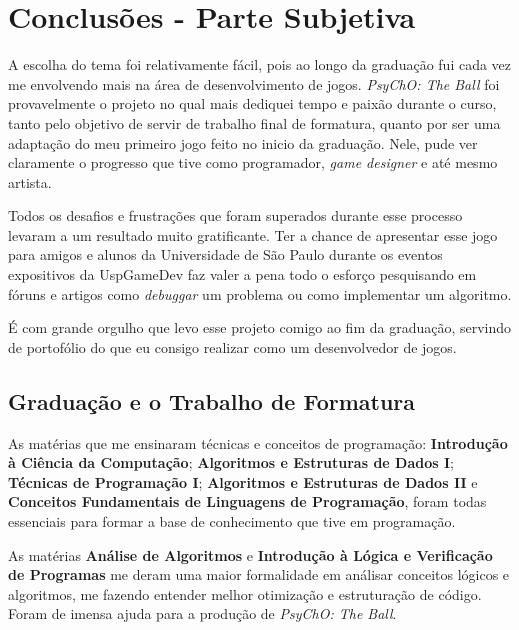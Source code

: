 \chapter{Conclusões - Parte Subjetiva}
\label{cap:conclusoes}

A escolha do tema foi relativamente fácil, pois ao longo da graduação fui cada vez me envolvendo mais na área de desenvolvimento de jogos. \textit{PsyChO: The Ball} foi provavelmente o projeto no qual mais dediquei tempo e paixão durante o curso, tanto pelo objetivo de servir de trabalho final de formatura, quanto por ser uma adaptação do meu primeiro jogo feito no inicio da graduação. Nele, pude ver claramente o progresso que tive como programador, \textit{game designer} e até mesmo artista.

Todos os desafios e frustrações que foram superados durante esse processo levaram a um resultado muito gratificante. Ter a chance de apresentar esse jogo para amigos e alunos da Universidade de São Paulo durante os eventos expositivos da UspGameDev faz valer a pena todo o esforço pesquisando em fóruns e artigos como \textit{debuggar} um problema ou como implementar um algoritmo.

É com grande orgulho que levo esse projeto comigo ao fim da graduação, servindo de portofólio do que eu consigo realizar como um desenvolvedor de jogos.

\section{Graduação e o Trabalho de Formatura}
\label{sec:materias_utilizadas}

As matérias que me ensinaram técnicas e conceitos de programação: \textbf{Introdução à Ciência da Computação}; \textbf{Algoritmos e Estruturas de Dados I}; \textbf{Técnicas de Programação I}; \textbf{Algoritmos e Estruturas de Dados II} e \textbf{Conceitos Fundamentais de Linguagens de Programação}, foram todas essenciais para formar a base de conhecimento que tive em programação.

As matérias \textbf{Análise de Algoritmos} e \textbf{Introdução à Lógica e Verificação de Programas} me deram uma maior formalidade em análisar conceitos lógicos e algoritmos, me fazendo entender melhor otimização e estruturação de código. Foram de imensa ajuda para a produção de \textit{PsyChO: The Ball}.

